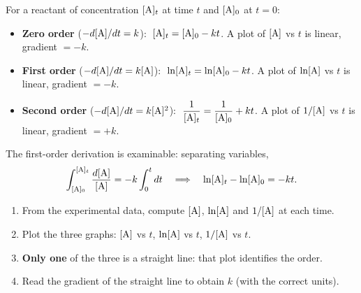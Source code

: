 \documentclass[11pt]{article}
\begin{document}
\begin{propriete}
For a reactant  of concentration $[\ce{A}]_t$ at time $t$ and $[\ce{A}]_0$ at $t=0$:
\begin{itemize}
\item \textbf{Zero order} ($-d[\ce{A}]/dt = k$): $\;[\ce{A}]_t = [\ce{A}]_0 - kt$. A plot of $[\ce{A}]$ vs $t$ is linear, gradient $= -k$.
\item \textbf{First order} ($-d[\ce{A}]/dt = k[\ce{A}]$): $\;\ln[\ce{A}]_t = \ln[\ce{A}]_0 - kt$. A plot of $\ln[\ce{A}]$ vs $t$ is linear, gradient $= -k$.
\item \textbf{Second order} ($-d[\ce{A}]/dt = k[\ce{A}]^2$): $\;\dfrac{1}{[\ce{A}]_t} = \dfrac{1}{[\ce{A}]_0} + kt$. A plot of $1/[\ce{A}]$ vs $t$ is linear, gradient $= +k$.
\end{itemize}
The first-order derivation is examinable: separating variables,
\[
\int_{[\ce{A}]_0}^{[\ce{A}]_t} \frac{d[\ce{A}]}{[\ce{A}]} = -k\int_0^t dt
\quad\Longrightarrow\quad
\ln[\ce{A}]_t - \ln[\ce{A}]_0 = -kt.
\]
\end{propriete}

\begin{methode}
\begin{enumerate}
\item From the experimental data, compute $[\ce{A}]$, $\ln[\ce{A}]$ and $1/[\ce{A}]$ at each time.
\item Plot the three graphs: $[\ce{A}]$ vs $t$, $\ln[\ce{A}]$ vs $t$, $1/[\ce{A}]$ vs $t$.
\item \textbf{Only one} of the three is a straight line: that plot identifies the order.
\item Read the gradient of the straight line to obtain $k$ (with the correct units).
\end{enumerate}
\end{methode}
\end{document}
